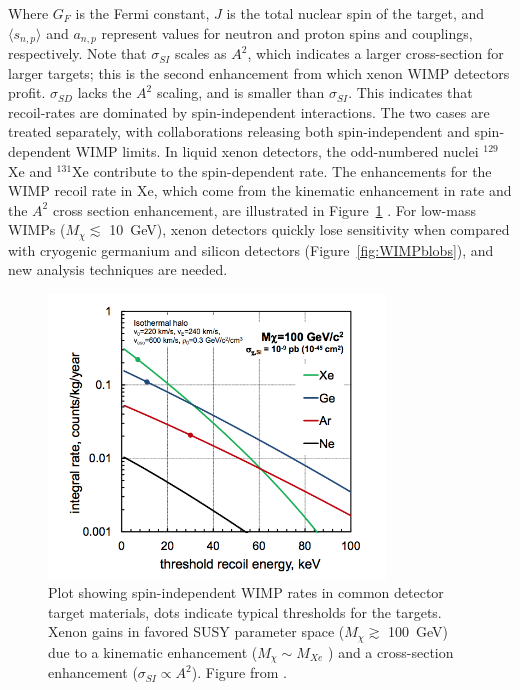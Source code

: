 Where $G_{F}$ is the Fermi constant, $J$ is the total nuclear spin of the target, and $\langle s_{n,p} \rangle$ and $a_{n,p}$ represent values for neutron and proton spins and couplings, respectively. Note that $\sigma_{SI}$ scales as $A^{2}$, which indicates a larger cross-section for larger targets; this is the second enhancement from which xenon \ac{WIMP} detectors profit. $\sigma_{SD}$ lacks the $A^{2}$ scaling, and is smaller than $\sigma_{SI}$. This indicates that recoil-rates are dominated by spin-independent interactions. The two cases are treated separately, with collaborations releasing both spin-independent and spin-dependent \ac{WIMP} limits. In liquid xenon detectors, the odd-numbered nuclei $^{129}$Xe and $^{131}$Xe contribute to the spin-dependent rate. The enhancements for the \ac{WIMP} recoil rate in Xe, which come from the kinematic enhancement in rate and the $A^{2}$ cross section enhancement, are illustrated in Figure~\ref{fig:wimp_rates} \cite{Chepel2013}. For low-mass \ac{WIMP}s ($M_{\chi} \lesssim $ 10~GeV), xenon detectors quickly lose sensitivity when compared with cryogenic germanium and silicon detectors (Figure~\ref{fig:WIMPblobs}), and new analysis techniques are needed. 


\begin{figure}[htbp]
\begin{center}
\includegraphics[width=0.8\textwidth]{figures/lxetpcs/wimp_rates.png}
\caption{Plot showing spin-independent \acs{WIMP} rates in common detector target materials, dots indicate typical thresholds for the targets. Xenon gains in favored \acs{SUSY} parameter space ($M_{\chi} \gtrsim$ 100~GeV) due to a kinematic enhancement ($M_{\chi} \sim M_{Xe}$ ) and a cross-section enhancement ($\sigma_{SI} \propto A^{2}$). Figure from \cite{Chepel2013}.}
\label{fig:wimp_rates}
\end{center}
\end{figure}


